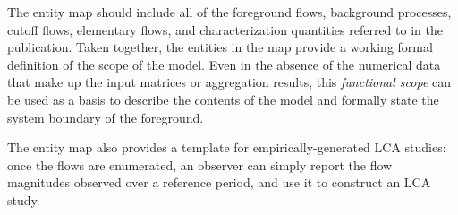The entity map should include all of the foreground flows, background processes, cutoff flows, elementary flows, and characterization quantities referred to in the publication.  Taken together, the entities in the map provide a working formal definition of the scope of the model.  Even in the absence of the numerical data that make up the input matrices or aggregation results, this \emph{functional scope} can be used as a basis to describe the contents of the model and formally state the system boundary of the foreground.

The entity map also provides a template for empirically-generated LCA studies: once the flows are enumerated, an observer can simply report the flow magnitudes observed over a reference period, and use it to construct an LCA study.
